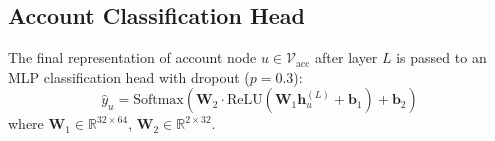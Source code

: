\subsection{Account Classification Head}
The final representation of account node $u \in \mathcal{V}_{\text{acc}}$ after layer $L$ is passed to an MLP classification head with dropout ($p = 0.3$):
\begin{equation}
    \hat{y}_u = \text{Softmax}\left( \mathbf{W}_2 \cdot \text{ReLU}\left(\mathbf{W}_1 \mathbf{h}_u^{(L)} + \mathbf{b}_1\right) + \mathbf{b}_2 \right)
\end{equation}
where $\mathbf{W}_1 \in \mathbb{R}^{32 \times 64}$, $\mathbf{W}_2 \in \mathbb{R}^{2 \times 32}$.
